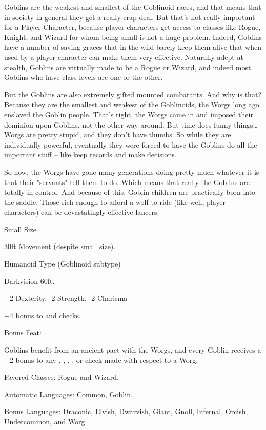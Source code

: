 
Goblins are the weakest and smallest of the Goblinoid races, and that means that in society in general they get a really crap deal. But that's not really important for a Player Character, because player characters get access to classes like Rogue, Knight, and Wizard for whom being small is not a huge problem. Indeed, Goblins have a number of saving graces that in the wild barely keep them alive that when used by a player character can make them very effective. Naturally adept at stealth, Goblins are virtually made to be a Rogue or Wizard, and indeed most Goblins who have class levels are one or the other.

But the Goblins are also extremely gifted mounted combatants. And why is that? Because they are the smallest and weakest of the Goblinoids, the Worgs long ago enslaved the Goblin people. That's right, the Worgs came in and imposed their dominion upon Goblins, not the other way around. But time does funny things\ldots{} Worgs are pretty stupid, and they don't have thumbs. So while they are individually powerful, eventually they were forced to have the Goblins do all the important stuff -- like keep records and make decisions.

So now, the Worgs have gone many generations doing pretty much whatever it is that their "servants" tell them to do. Which means that really the Goblins are totally in control. And because of this, Goblin children are practically born into the saddle. Those rich enough to afford a wolf to ride (like well, player characters) can be devastatingly effective lancers.

\begin{itemize*}
\item Small Size
\item 30ft Movement (despite small size).
\item Humanoid Type (Goblinoid subtype)
\item Darkvision 60ft.
\item +2 Dexterity, -2 Strength, -2 Charisma
\item +4 bonus to  and  checks.
\item Bonus Feat: .
\item Goblins benefit from an ancient pact with the Worgs, and every Goblin receives a +2 bonus to any , , , , or  check made with respect to a Worg.
\item Favored Classes: Rogue and Wizard.
\item Automatic Languages: Common, Goblin.
\item Bonus Languages: Draconic, Elvish, Dwarvish, Giant, Gnoll, Infernal, Orcish, Undercommon, and Worg.
\end{itemize*}
